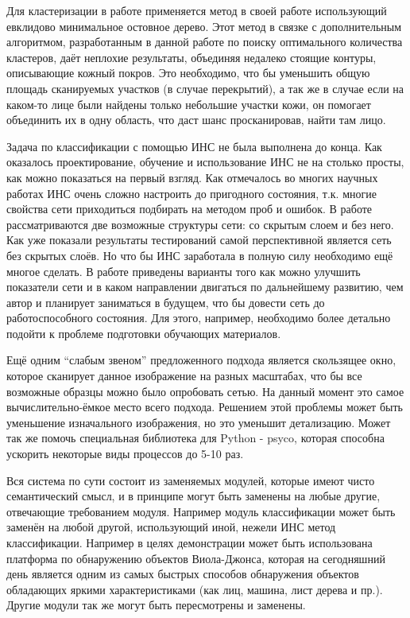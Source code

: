 \documentclass[12pt]{report}
\begin{document}
Для кластеризации в работе применяется метод в своей работе использующий евклидово минимальное остовное дерево. Этот метод в связке с дополнительным алгоритмом, разработанным в данной работе по поиску оптимального количества кластеров, даёт неплохие результаты, объединяя недалеко стоящие контуры, описывающие кожный покров. Это необходимо, что бы уменьшить общую площадь сканируемых участков (в случае перекрытий), а так же в случае если на каком-то лице были найдены только небольшие участки кожи, он помогает объединить их в одну область, что даст шанс просканировав, найти там лицо.

Задача по классификации с помощью ИНС не была выполнена до конца. Как оказалось проектирование, обучение и использование ИНС не на столько просты, как можно показаться на первый взгляд. Как отмечалось во многих научных работах ИНС очень сложно настроить до пригодного состояния, т.к. многие свойства сети приходиться подбирать на методом проб и ошибок. В работе рассматриваются две возможные структуры сети: со скрытым слоем и без него. Как уже показали результаты тестирований самой перспективной является сеть без скрытых слоёв. Но что бы ИНС заработала в полную силу необходимо ещё многое сделать. В работе приведены варианты того как можно улучшить показатели сети и в каком направлении двигаться по дальнейшему развитию, чем автор и планирует заниматься в будущем, что бы довести сеть до работоспособного состояния. Для этого, например, необходимо более детально подойти к проблеме подготовки обучающих материалов.

Ещё одним ``слабым звеном'' предложенного подхода является скользящее окно, которое сканирует данное изображение на разных масштабах, что бы все возможные образцы можно было опробовать сетью. На данный момент это самое вычислительно-ёмкое место всего подхода. Решением этой проблемы может быть уменьшение изначального изображения, но это уменьшит детализацию. Может так же помочь специальная библиотека для Python - psyco, которая способна ускорить некоторые виды процессов до 5-10 раз.

Вся система по сути состоит из заменяемых модулей, которые имеют чисто семантический смысл, и в принципе могут быть заменены на любые другие, отвечающие требованием модуля. Например модуль классификации может быть заменён на любой другой, использующий иной, нежели ИНС метод классификации. Например в целях демонстрации может быть использована платформа по обнаружению объектов Виола-Джонса, которая на сегодняшний день является одним из самых быстрых способов обнаружения объектов обладающих яркими характеристиками (как лиц, машина, лист дерева и пр.). Другие модули так же могут быть пересмотрены и заменены.
\end{document}
